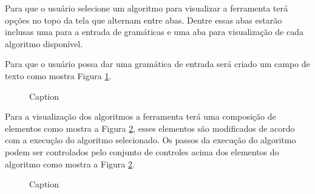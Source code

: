 Para que o usuário selecione um algoritmo para visualizar a ferramenta terá opções no topo da tela que alternam entre abas. Dentre essas abas estarão inclusas uma para a entrada de gramáticas e uma aba para visualização de cada algoritmo disponível.

Para que o usuário possa dar uma gramática de entrada será criado um campo de texto como mostra Figura \ref{fig:mgrammar}.

\begin{figure}[ht]
    \centering
    \captionsetup{width=16cm}
    \caption{Caption}
    \label{fig:mgrammar}
\end{figure}
\FloatBarrier

Para a visualização dos algoritmos a ferramenta terá uma composição de elementos como mostra a Figura \ref{fig:mfirst}, esses elementos são modificados de acordo com a execução do algoritmo selecionado. Os passos da execução do algoritmo podem ser controlados pelo conjunto de controles acima dos elementos do algoritmo como mostra a Figura \ref{fig:mfirst}.

\begin{figure}[ht]
    \centering
    \captionsetup{width=16cm}
    \caption{Caption}
    \label{fig:mfirst}
\end{figure}
\FloatBarrier

